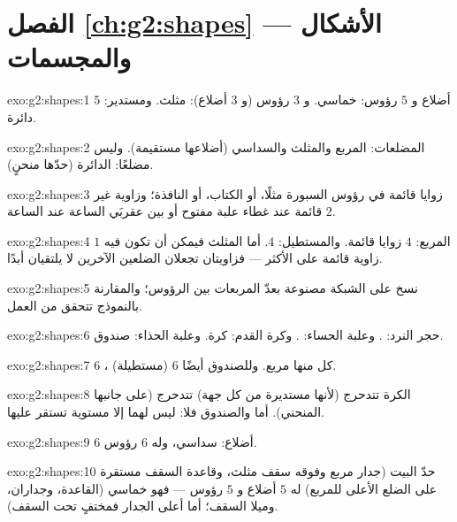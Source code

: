 \section*{الفصل \ref{ch:g2:shapes} --- الأشكال والمجسمات}

\begin{solution}{exo:g2:shapes:1}
$5$ أضلاع و $5$ رؤوس: خماسي. و $3$ رؤوس (و $3$ أضلاع):
مثلث. ومستدير: دائرة.
\end{solution}

\begin{solution}{exo:g2:shapes:2}
المضلعات: المربع والمثلث والسداسي (أضلاعها مستقيمة). وليس
مضلعًا: الدائرة (حدّها منحنٍ).
\end{solution}

\begin{solution}{exo:g2:shapes:3}
زوايا قائمة في رؤوس السبورة مثلًا، أو الكتاب، أو
النافذة؛ وزاوية غير قائمة عند غطاء علبة مفتوح أو بين عقربَي
الساعة عند الساعة $2$.
\end{solution}

\begin{solution}{exo:g2:shapes:4}
المربع: $4$ زوايا قائمة. والمستطيل: $4$. أما المثلث فيمكن أن
تكون فيه $1$ زاوية قائمة على الأكثر --- فزاويتان تجعلان الضلعين
الآخرين لا يلتقيان أبدًا.
\end{solution}

\begin{solution}{exo:g2:shapes:5}
نسخ على الشبكة مصنوعة بعدّ المربعات بين الرؤوس؛ والمقارنة
بالنموذج تتحقق من العمل.
\end{solution}

\begin{solution}{exo:g2:shapes:6}
حجر النرد: . وعلبة الحساء: . وكرة القدم: كرة. وعلبة الحذاء: صندوق.
\end{solution}

\begin{solution}{exo:g2:shapes:7}
 $6$ ، كل  منها مربع. وللصندوق أيضًا $6$ 
(مستطيلة).
\end{solution}

\begin{solution}{exo:g2:shapes:8}
الكرة تتدحرج (لأنها مستديرة من كل جهة)  تتدحرج (على
جانبها المنحني). أما  والصندوق فلا: ليس لهما إلا 
مستوية تستقر عليها.
\end{solution}

\begin{solution}{exo:g2:shapes:9}
$6$ أضلاع: سداسي، وله $6$ رؤوس.
\end{solution}

\begin{solution}{exo:g2:shapes:10}
حدّ البيت (جدار مربع وفوقه سقف مثلث، وقاعدة السقف مستقرة على
الضلع الأعلى للمربع) له $5$ أضلاع و $5$ رؤوس ---
فهو خماسي (القاعدة، وجداران، وميلا السقف؛ أما أعلى
الجدار فمختفٍ تحت السقف).
\end{solution}
